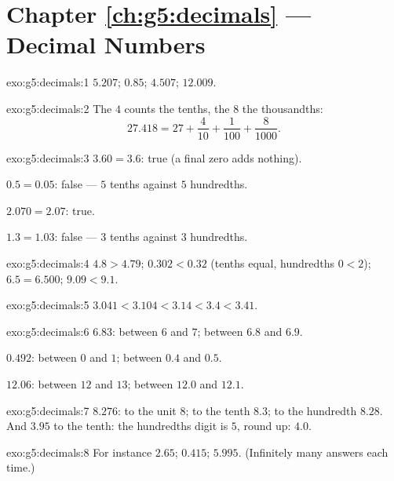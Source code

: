 \section*{Chapter \ref{ch:g5:decimals} --- Decimal Numbers}

\begin{solution}{exo:g5:decimals:1}
$5.207$; \quad $0.85$; \quad $4.507$; \quad $12.009$.
\end{solution}

\begin{solution}{exo:g5:decimals:2}
The $4$ counts the tenths, the $8$ the thousandths:
\[
27.418 = 27 + \frac{4}{10} + \frac{1}{100} + \frac{8}{1000}.
\]
\end{solution}

\begin{solution}{exo:g5:decimals:3}
$3.60 = 3.6$: true (a final zero adds nothing).

$0.5 = 0.05$: false --- $5$ tenths against $5$ hundredths.

$2.070 = 2.07$: true.

$1.3 = 1.03$: false --- $3$ tenths against $3$ hundredths.
\end{solution}

\begin{solution}{exo:g5:decimals:4}
$4.8 > 4.79$; \quad $0.302 < 0.32$ (tenths equal, hundredths
$0 < 2$); \quad $6.5 = 6.500$; \quad $9.09 < 9.1$.
\end{solution}

\begin{solution}{exo:g5:decimals:5}
$3.041 < 3.104 < 3.14 < 3.4 < 3.41$.
\end{solution}

\begin{solution}{exo:g5:decimals:6}
$6.83$: between $6$ and $7$; between $6.8$ and $6.9$.

$0.492$: between $0$ and $1$; between $0.4$ and $0.5$.

$12.06$: between $12$ and $13$; between $12.0$ and $12.1$.
\end{solution}

\begin{solution}{exo:g5:decimals:7}
$8.276$: to the unit $8$; to the tenth $8.3$; to the hundredth
$8.28$. And $3.95$ to the tenth: the hundredths digit is $5$, round
up: $4.0$.
\end{solution}

\begin{solution}{exo:g5:decimals:8}
For instance $2.65$; \quad $0.415$; \quad $5.995$. (Infinitely many
answers each time.)
\end{solution}

